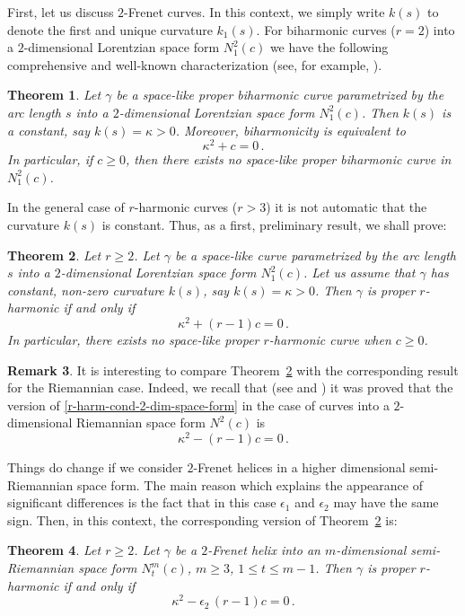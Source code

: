 \documentclass[11pt]{amsart}
\theoremstyle{plain}
\newtheorem{theorem}                {Theorem}      [section]
\theoremstyle{definition}
\newtheorem{remark}       [theorem]  {Remark}
\numberwithin{equation}{section}
\begin{document}
First, let us discuss $2$-Frenet curves. In this context, we simply write $k(s)$ to denote the first and unique curvature $k_1(s)$. For biharmonic curves ($r=2$) into a $2$-dimensional Lorentzian space form $N^2_1(c)$ we have the following comprehensive and well-known characterization (see, for example, \cite{Sasahara}).
\begin{theorem}\label{Cor-biharm-2-dim-space-form}
Let $\gamma$ be a space-like proper biharmonic curve parametrized by the arc length $s$ into a $2$-dimensional Lorentzian space form $N^2_1(c)$. Then $k(s)$ is a constant, say $k(s)=\kappa>0$. Moreover, biharmonicity is equivalent to
\begin{equation}\label{biharm-cond-2-dim-space-form}
\kappa^2 + c =0\,.
\end{equation}
In particular, if $c\geq0$, then there exists no space-like proper biharmonic curve in $N^2_1(c)$.
\end{theorem}
In the general case of $r$-harmonic curves ($r>3$) it is not automatic that the curvature $k(s)$ is constant. Thus, as a first, preliminary result, we shall prove:
\begin{theorem}\label{Prop-r-harm-2-dim-space-form}
Let $r \geq 2$. Let $\gamma$ be a space-like curve parametrized by the arc length $s$ into a $2$-dimensional Lorentzian space form $N^2_1(c)$. Let us assume that $\gamma$ has constant, non-zero curvature $k(s)$, say $k(s)=\kappa>0$. Then $\gamma$ is proper $r$-harmonic if and only if
\begin{equation}\label{r-harm-cond-2-dim-space-form}
\kappa^2 + (r-1)c =0\,.
\end{equation}
In particular, there exists no space-like proper $r$-harmonic curve when $c \geq 0$. 
\end{theorem}
\begin{remark} It is interesting to compare Theorem~\ref{Prop-r-harm-2-dim-space-form} with the corresponding result for the Riemannian case. 
Indeed, we recall that  (see \cite{MR4542687} and \cite{MR3007953}) it was proved that the version of \eqref{r-harm-cond-2-dim-space-form} in the case of curves into a $2$-dimensional  Riemannian space form $N^2(c)$ is
\[
\kappa^2 - (r-1)c =0\,.
\]
\end{remark}

Things do change if we consider $2$-Frenet helices in a higher dimensional semi-Riemannian space form. The main reason which explains the appearance of significant differences is the fact that in this case $\epsilon_1$ and $\epsilon_2$ may have the same sign. 
Then, in this context, the corresponding version of Theorem~\ref{Prop-r-harm-2-dim-space-form} is:
\begin{theorem}\label{Prop-r-harm-m-dim-space-form}
Let $r \geq 2$. Let $\gamma$ be a $2$-Frenet helix into an $m$-dimensional semi-Riemannian space form $N^m_t(c)$, $m \geq 3$, $1 \leq t \leq m-1$. Then $\gamma$ is proper $r$-harmonic if and only if
\begin{equation}\label{r-harm-cond-2-dim-space-form-bis}
\kappa^2 -\epsilon_2 \, (r-1)c =0\,.
\end{equation}
\end{theorem}
\end{document}
